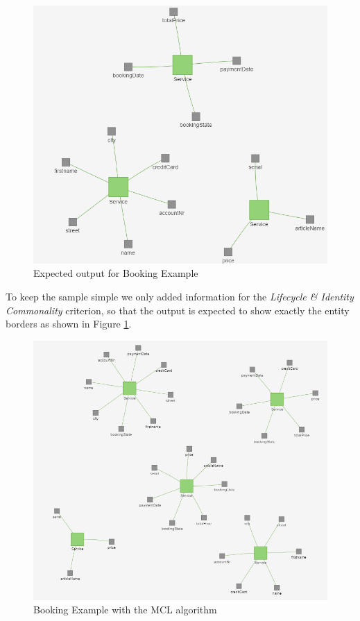 \begin{figure}[H]
	\begin{center}
		\includegraphics[scale=0.75]{images/booking_entities.png}
	\end{center}
	\caption{Expected output for Booking Example}
	\label{fig:bookingExample}
\end{figure}

To keep the sample simple we only added information for the \textit{Lifecycle \& Identity Commonality} criterion, so that the output is expected to show exactly the entity borders as shown in Figure \ref{fig:bookingExample}.


\begin{figure}[H]
	\begin{center}
		\includegraphics[scale=0.7]{images/booking_entities_mcl.png}
	\end{center}
	\caption{Booking Example with the MCL algorithm}
	\label{fig:bookingExampleMCL}
\end{figure}

